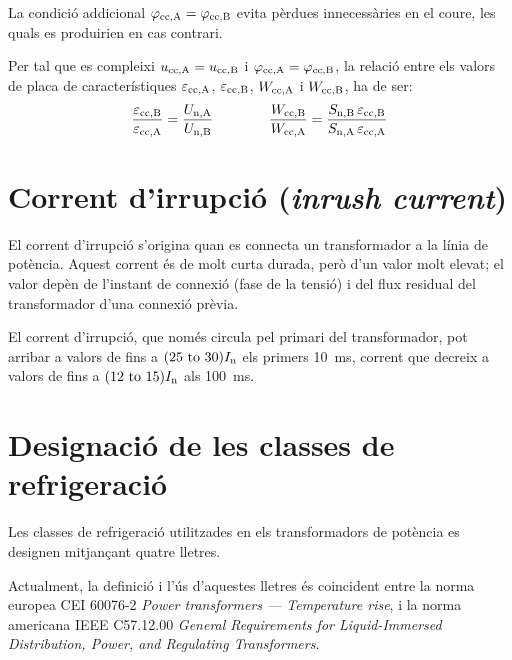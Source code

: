 La condició addicional $\varphi_\mathrm{cc,A} =\varphi_\mathrm{cc,B}$ evita pèrdues innecessàries en el coure, les quals es produirien en cas contrari.

Per tal que es compleixi $u_\mathrm{cc,A} = u_\mathrm{cc,B} $ i $\varphi_\mathrm{cc,A} =\varphi_\mathrm{cc,B}$, la relació entre els valors de placa de característiques $\varepsilon_\mathrm{cc,A}$, $\varepsilon_\mathrm{cc,B}$, $W_\mathrm{cc,A}$ i $W_\mathrm{cc,B}$, ha de ser:
\begin{equation}
    \frac{\varepsilon_\mathrm{cc,B}}{\varepsilon_\mathrm{cc,A}} = \frac{U_\mathrm{n,A}}{U_\mathrm{n,B}} \qquad\qquad
    \frac{W_\mathrm{cc,B}}{W_\mathrm{cc,A}} = \frac{S_\mathrm{n,B} \,\varepsilon_\mathrm{cc,B}}{S_\mathrm{n,A}\, \varepsilon_\mathrm{cc,A}}
\end{equation}

\section{Corrent d'irrupció (\textit{inrush current})}

El corrent d'irrupció s'origina quan es  connecta un transformador a la línia de potència. Aquest corrent és de molt curta durada, però d'un valor molt elevat; el valor depèn de l'instant de connexió (fase de la tensió) i del flux residual del transformador d'una connexió prèvia.

El corrent d'irrupció, que només circula pel primari del transformador, pot arribar a valors de fins a $(\numrange{25}{30}) I\ped{n}$ els primers \qty{10}{ms}, corrent que decreix a valors de fins  a $(\numrange{12}{15}) I\ped{n}$ als \qty{100}{ms}.

\section{Designació de les classes de refrigeració}\label{sec:trafos-pot-refrig}
 

Les classes de refrigeració utilitzades en els transformadors de
potència es designen mitjançant quatre lletres.

Actualment, la definició i l'ús d'aquestes lletres és coincident
entre la norma europea CEI 60076-2 \textit{Power transformers --- Temperature rise}, i la norma americana
IEEE C57.12.00  \textit{General Requirements for Liquid-Immersed Distribution, Power, and Regulating Transformers}.

